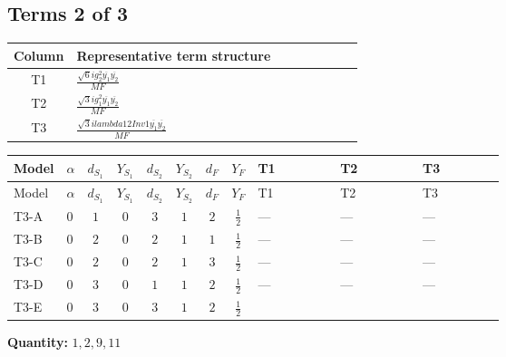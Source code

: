 \documentclass[8pt]{article}
\begin{document}
\begin{landscape}
\subsection*{Terms 2 of 3}
\begin{center}
\begin{tabular}{@{}c >{\raggedright\arraybackslash}p{0.82\linewidth}@{}}
\toprule
Column & Representative term structure \\
\midrule
T1 & \(\displaystyle \frac{\sqrt{6} i g_{2}^{2} \overline{y_{1}} \overline{y_{2}}}{MF}\) \\
\midrule
T2 & \(\displaystyle \frac{\sqrt{3} i g_{1}^{2} \overline{y_{1}} \overline{y_{2}}}{MF}\) \\
\midrule
T3 & \(\displaystyle \frac{\sqrt{3} i lambda12Inv1 \overline{y_{1}} \overline{y_{2}}}{MF}\) \\
\midrule
\bottomrule
\end{tabular}
\end{center}
\smallskip
\tiny
\begin{longtable}{@{}llcccccc >{\raggedright\arraybackslash}p{0.21\linewidth} >{\raggedright\arraybackslash}p{0.21\linewidth} >{\raggedright\arraybackslash}p{0.21\linewidth}@{}}
\toprule
Model & $\alpha$ & $d_{S_1}$ & $Y_{S_1}$ & $d_{S_2}$ & $Y_{S_2}$ & $d_F$ & $Y_F$ & T1 & T2 & T3 \\
\midrule
\endfirsthead
\toprule
Model & $\alpha$ & $d_{S_1}$ & $Y_{S_1}$ & $d_{S_2}$ & $Y_{S_2}$ & $d_F$ & $Y_F$ & T1 & T2 & T3 \\
\midrule
\endhead
T3-A & $0$ & $1$ & $0$ & $3$ & $1$ & $2$ & $\frac{1}{2}$ & --- & --- & --- \\
\midrule
T3-B & $0$ & $2$ & $0$ & $2$ & $1$ & $1$ & $\frac{1}{2}$ & --- & --- & --- \\
\midrule
T3-C & $0$ & $2$ & $0$ & $2$ & $1$ & $3$ & $\frac{1}{2}$ & --- & --- & --- \\
\midrule
T3-D & $0$ & $3$ & $0$ & $1$ & $1$ & $2$ & $\frac{1}{2}$ & --- & --- & --- \\
\midrule
T3-E & $0$ & $3$ & $0$ & $3$ & $1$ & $2$ & $\frac{1}{2}$ & \scriptsize\adjustbox{max width=\linewidth}{$\begin{gathered} - \frac{\sqrt{6} i g_{2}^{2} \overline{y_{1}} \overline{y_{2}}}{6 MF}\end{gathered}$} & \scriptsize\adjustbox{max width=\linewidth}{$\begin{gathered} - \frac{\sqrt{3} i g_{1}^{2} \overline{y_{1}} \overline{y_{2}}}{8 MF}\end{gathered}$} & \scriptsize\adjustbox{max width=\linewidth}{$\begin{gathered} \frac{\sqrt{3} i lambda12Inv1 \overline{y_{1}} \overline{y_{2}}}{6 MF}\end{gathered}$} \\
\midrule
\bottomrule
\end{longtable}
\clearpage
\noindent\textbf{Quantity: }$\mathrm{1,2,9,11}$\par\smallskip

\end{landscape}
\end{document}
